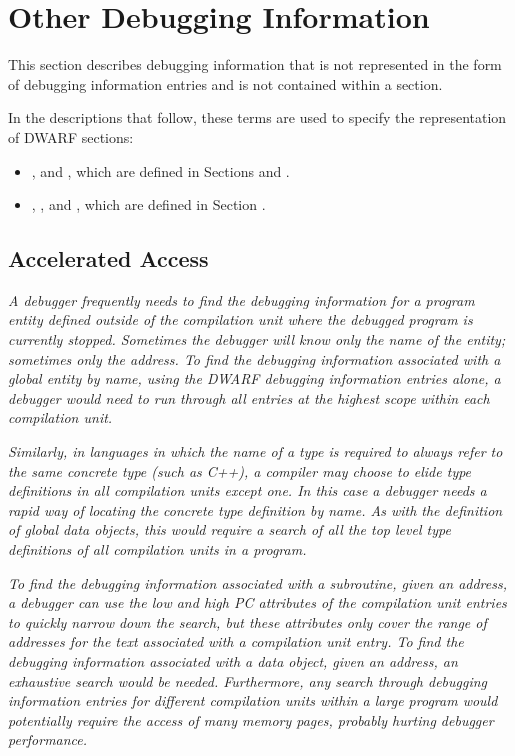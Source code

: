 \chapter{Other Debugging Information}
\label{chap:otherdebugginginformation}
This section describes debugging information that is not
represented in the form of debugging information entries and
is not contained within a \dotdebuginfo{} section.

In the descriptions that follow, these terms are used to
specify the representation of DWARF sections:
\begin{itemize}
\item
\HFTinitiallength{}, \HFTsectionoffset{} and 
\HFTsectionlength{}, which are
defined in 
Sections  and 
.
\item
\HFTsbyte{}, 
\HFTubyte{}, 
\HFTuhalf{} and 
\HFTuword{}, 
which are defined in 
Section .
\end{itemize}

\section{Accelerated Access}
\label{chap:acceleratedaccess}

\textit{A debugger frequently needs to find the debugging information
for a program entity defined outside of the compilation unit
where the debugged program is currently stopped. Sometimes the
debugger will know only the name of the entity; sometimes only
the address. To find the debugging information associated with
a global entity by name, using the DWARF debugging information
entries alone, a debugger would need to run through all
entries at the highest scope within each compilation unit.}

\textit{Similarly, in languages in which the name of a type is
required to always refer to the same concrete type (such as
C++), a compiler may choose to elide type definitions in
all compilation units except one. In this case a debugger
needs a rapid way of locating the concrete type definition
by name. As with the definition of global data objects, this
would require a search of all the top level type definitions
of all compilation units in a program.}

\textit{To find the debugging information associated with a subroutine,
given an address, a debugger can use the low and high PC
attributes of the compilation unit entries to quickly narrow
down the search, but these attributes only cover the range
of addresses for the text associated with a compilation unit
entry. To find the debugging information associated with a
data object, given an address, an exhaustive search would be
needed. Furthermore, any search through debugging information
entries for different compilation units within a large program
would potentially require the access of many memory pages,
probably hurting debugger performance.}

